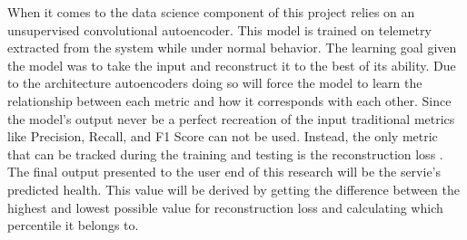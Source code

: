 When it comes to the data science component of this project relies on an unsupervised convolutional autoencoder. This model is trained on telemetry extracted from the system while under normal behavior. The learning goal given the model was to take the input and reconstruct it to the best of its ability. Due to the architecture autoencoders doing so will force the model to learn the relationship between each metric and how it corresponds with each other. Since the model's output never be a perfect recreation of the input traditional metrics like Precision, Recall, and F1 Score can not be used. Instead, the only metric that can be tracked during the training and testing is the reconstruction loss \citep{ghasedi2017deep}. The final output presented to the user end of this research will be the servie's predicted health. This value will be derived by getting the difference between the highest and lowest possible value for reconstruction loss and calculating which percentile it belongs to.